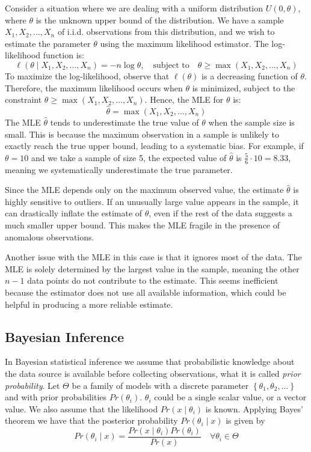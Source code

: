 \begin{example}
Consider a situation where we are dealing with a uniform distribution \( U(0, \theta) \), where \( \theta \) is the unknown upper bound of the distribution. We have a sample \( X_1, X_2, \dots, X_n \) of i.i.d. observations from this distribution, and we wish to estimate the parameter \( \theta \) using the maximum likelihood estimator. The log-likelihood function is:
\[
\ell(\theta \mid X_1, X_2, \dots, X_n) = -n \log \theta, \quad \text{subject to} \quad \theta \geq \max(X_1, X_2, \dots, X_n)
\]
To maximize the log-likelihood, observe that \( \ell(\theta) \) is a decreasing function of \( \theta \). Therefore, the maximum likelihood occurs when \( \theta \) is minimized, subject to the constraint \( \theta \geq \max(X_1, X_2, \dots, X_n) \). Hence, the MLE for \( \theta \) is:
\[
\hat{\theta} = \max(X_1, X_2, \dots, X_n)
\]
The MLE \( \hat{\theta} \) tends to underestimate the true value of \( \theta \) when the sample size is small. This is because the maximum observation in a sample is unlikely to exactly reach the true upper bound, leading to a systematic bias. For example, if \( \theta = 10 \) and we take a sample of size 5, the expected value of \( \hat{\theta} \) is \( \frac{5}{6} \cdot 10 = 8.33 \), meaning we systematically underestimate the true parameter.

Since the MLE depends only on the maximum observed value, the estimate \( \hat{\theta} \) is highly sensitive to outliers. If an unusually large value appears in the sample, it can drastically inflate the estimate of \( \theta \), even if the rest of the data suggests a much smaller upper bound. This makes the MLE fragile in the presence of anomalous observations.

Another issue with the MLE in this case is that it ignores most of the data. The MLE is solely determined by the largest value in the sample, meaning the other \( n-1 \) data points do not contribute to the estimate. This seems inefficient because the estimator does not use all available information, which could be helpful in producing a more reliable estimate.
\end{example}


\subsection{Bayesian Inference}
\label{sec:bayesian_inference}

In Bayesian statistical inference we assume that probabilistic knowledge about the data source is available before collecting observations, what it is called \emph{prior probability}. Let $\Theta$ be a family of models with a discrete parameter $\left\{ \theta_1,\theta_2,\ldots \right\}$ and with prior probabilities $Pr\left(\theta_i \right)$. {\color{red} $\theta_i$ could be a single scalar value, or a vector value.} We also assume that the likelihood $Pr\left(x \mid \theta_i \right)$ is known. Applying Bayes' theorem we have that the posterior probability $Pr\left(\theta_i \mid x\right)$ is given by
\[
    Pr\left(\theta_i \mid x\right) = \frac{Pr\left(x\mid\theta_i\right) Pr\left(\theta_i \right)}{Pr\left(x\right)} \quad \forall \theta_i \in \Theta
\]

